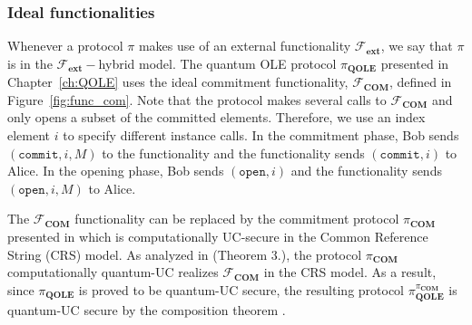  


\subsubsection{Ideal functionalities}\label{functinalities}

Whenever a protocol $\pi$ makes use of an external functionality $\mathcal{F}_{\textbf{ext}}$, we say that $\pi$ is in the $\mathcal{F}_{\textbf{ext}}-$hybrid model. The quantum OLE protocol $\mathcal{\pi}_{\textbf{QOLE}}$ presented in Chapter~\ref{ch:QOLE} uses the ideal commitment functionality, $\mathcal{F}_{\textbf{COM}}$, defined in Figure~\ref{fig:func_com}. Note that the protocol makes several calls to $\mathcal{F}_{\textbf{COM}}$ and only opens a subset of the committed elements. Therefore, we use an index element $i$ to specify different instance calls. In the commitment phase, Bob sends $(\texttt{commit}, i, M)$ to the functionality and the functionality sends $(\texttt{commit}, i)$ to Alice. In the opening phase, Bob sends $(\texttt{open}, i)$ and the functionality sends $(\texttt{open}, i, M)$ to Alice.

The $\mathcal{F}_{\textbf{COM}}$ functionality can be replaced by the commitment protocol $\pi_{\textbf{COM}}$ presented in \cite{CF01} which is computationally UC-secure in the Common Reference String (CRS) model. As analyzed in \cite{CBGLM21} (Theorem 3.), the protocol $\pi_{\textbf{COM}}$ computationally quantum-UC realizes $\mathcal{F}_{\textbf{COM}}$ in the CRS model. As a result, since $\mathcal{\pi}_{\textbf{QOLE}}$ is proved to be quantum-UC secure, the resulting protocol $\pi_{\textbf{QOLE}}^{\pi_{\textbf{COM}}}$ is quantum-UC secure by the composition theorem \citep{Unruh10}.


%    
%    


